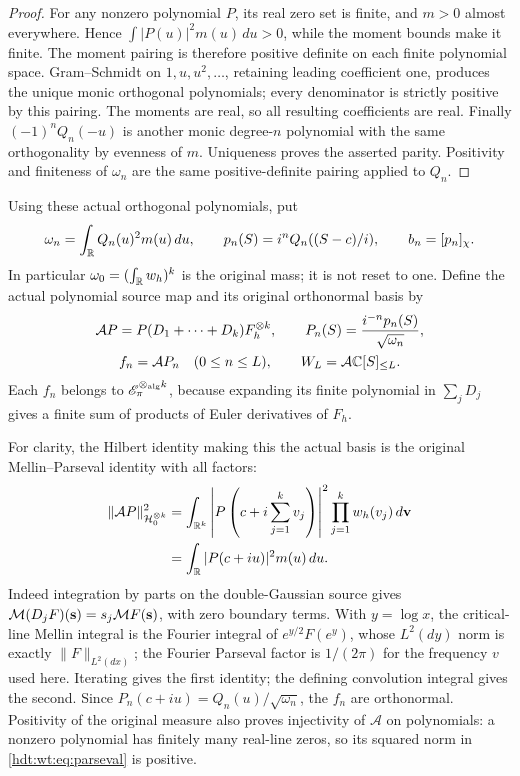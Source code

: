 \begin{proof}
For any nonzero polynomial $P$, its real zero set is finite,
and $m>0$ almost everywhere.  Hence
$\int |P(u)|^2m(u)\,du>0$, while the moment bounds make it
finite.  The moment pairing is therefore positive definite
on each finite polynomial space.  Gram--Schmidt on
$1,u,u^2,\ldots$, retaining leading coefficient one, produces
the unique monic orthogonal polynomials; every denominator is
strictly positive by this pairing.  The moments are real,
so all resulting coefficients are real.  Finally
$(-1)^nQ_n(-u)$ is another monic degree-$n$ polynomial with
the same orthogonality by evenness of $m$.  Uniqueness proves
the asserted parity.  Positivity and finiteness of $\omega_n$
are the same positive-definite pairing applied to $Q_n$.
\end{proof}

Using these actual orthogonal polynomials, put
\[
 \omega_n=\int_\mathbb R Q_n(u)^2m(u)\,du,\qquad
 p_n(S)=i^nQ_n((S-c)/i),\qquad b_n=[p_n]_\chi.
\]
In particular $\omega_0=(\int_\mathbb R w_h)^k$ is the original mass;
it is not reset to one.  Define the actual polynomial source map
and its original orthonormal basis by
\begin{equation}\label{hdt:wt:eq:actual-source}
\begin{gathered}
 \mathcal AP=P(D_1+\cdots+D_k)F_h^{\otimes k},\qquad
 P_n(S)=\frac{i^{-n}p_n(S)}{\sqrt{\omega_n}},\\
 f_n=\mathcal AP_n\quad(0\leq n\leq L),\qquad
 W_L=\mathcal A\mathbb C[S]_{\leq L}.
\end{gathered}
\end{equation}
Each $f_n$ belongs to $\mathscr E_\pi^{\otimes_{\mathrm{alg}} k}$,
because expanding its finite polynomial in $\sum_jD_j$ gives
a finite sum of products of Euler derivatives of $F_h$.

For clarity, the Hilbert identity making this the actual basis
is the original Mellin--Parseval identity with all factors:
\begin{equation}\label{hdt:wt:eq:parseval}
 \begin{split}
 \|\mathcal AP\|_{\mathcal H_0^{\otimes k}}^2
 &=\int_{\mathbb R^k}\left|P\left(c+i\sum_{j=1}^kv_j\right)\right|^2
              \prod_{j=1}^kw_h(v_j)\,d\mathbf v\\
 &=\int_\mathbb R|P(c+iu)|^2m(u)\,du.
 \end{split}
\end{equation}
Indeed integration by parts on the double-Gaussian source gives
$\mathcal M(D_jF)(\mathbf s)=s_j\mathcal M F(\mathbf s)$, with zero
boundary terms.  With $y=\log x$, the critical-line Mellin
integral is the Fourier integral of $e^{y/2}F(e^y)$, whose
$L^2(dy)$ norm is exactly $\|F\|_{L^2(dx)}$; the Fourier
Parseval factor is $1/(2\pi)$ for the frequency $v$ used here.
Iterating gives the first identity; the defining convolution
integral gives the second.  Since $P_n(c+iu)=Q_n(u)/\sqrt{\omega_n}$,
the $f_n$ are orthonormal.  Positivity of the original measure
also proves injectivity of $\mathcal A$ on polynomials: a nonzero
polynomial has finitely many real-line zeros, so its squared
norm in \eqref{hdt:wt:eq:parseval} is positive.

